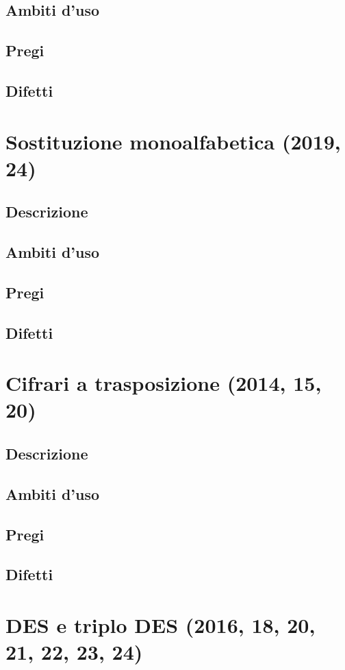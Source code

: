 \documentclass[10pt,oneside,a4paper]{article}
\begin{document}
\subsection{Ambiti d'uso}
\subsection{Pregi}
\subsection{Difetti}
\section{Sostituzione monoalfabetica (2019, 24)}
\subsection{Descrizione}
\subsection{Ambiti d'uso}
\subsection{Pregi}
\subsection{Difetti}
\section{Cifrari a trasposizione (2014, 15, 20)}
\subsection{Descrizione}
\subsection{Ambiti d'uso}
\subsection{Pregi}
\subsection{Difetti}
\section{DES e triplo DES (2016, 18, 20, 21, 22, 23, 24)}
\end{document}

